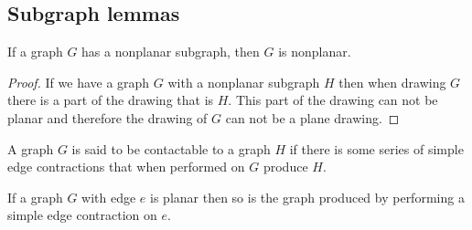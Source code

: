 \documentclass{article}
\begin{document}
\subsection{Subgraph lemmas}

\begin{lemma} \label{subgraph}
	If a graph $G$ has a nonplanar subgraph, then $G$ is nonplanar.
\end{lemma}

\begin{proof}
	If we have a graph $G$ with a nonplanar subgraph $H$ then when drawing $G$ there is a part of the drawing that is $H$. This part of the drawing can not be planar and therefore the drawing of $G$ can not be a plane drawing.
\end{proof}

\begin{definition}[contactable]
	A graph $G$ is said to be contactable to a graph $H$ if there is some series of simple edge contractions that when performed on $G$ produce $H$.
\end{definition}

\begin{lemma}
	If a graph $G$ with edge $e$ is planar then so is the graph produced by performing a simple edge contraction on $e$.
\end{lemma}
\end{document}
